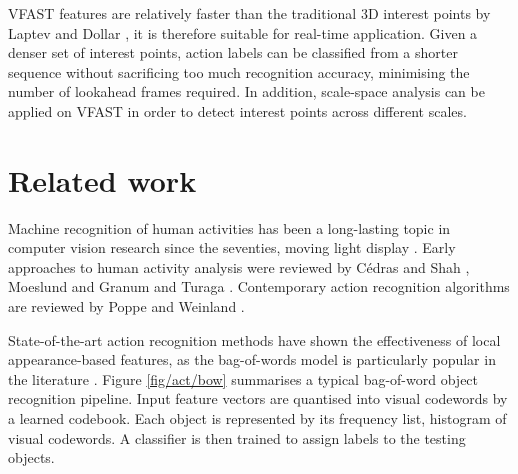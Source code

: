VFAST features are relatively faster than the traditional 3D interest points by Laptev \cite{Laptev2005} and Dollar \etal \cite{Dollar2005}, it is therefore suitable for real-time application. 
Given a denser set of interest points, action labels can be classified from a shorter sequence without sacrificing too much recognition accuracy, minimising the number of lookahead frames required. 
In addition, scale-space analysis can be applied on VFAST in order to detect interest points across different scales.



\section{Related work}
\label{sec/act/relatedwork}

Machine recognition of human activities has been a long-lasting topic in computer vision research since the seventies, \eg moving light display \cite{Johansson1973}. Early approaches to human activity analysis were reviewed by C\'edras and Shah \cite{Cedras1995}, Moeslund and Granum \cite{Moeslund2001} and Turaga \etal \cite{Turaga2008}. Contemporary action recognition algorithms are reviewed by Poppe \cite{Poppe2010} and Weinland \etal \cite{Weinland2011}.   

State-of-the-art action recognition methods have shown the effectiveness of local appearance-based features, as the bag-of-words model is particularly popular in the literature \cite{Schuldt2004, Dollar2005, Riemenschneider2009, Niebles2008, Wong2007}.
Figure \ref{fig/act/bow} summarises a typical bag-of-word object recognition pipeline. Input feature vectors are quantised into visual codewords by a learned codebook. Each object is represented by its frequency list, \ie histogram of visual codewords. A classifier is then trained to assign labels to the testing objects.

